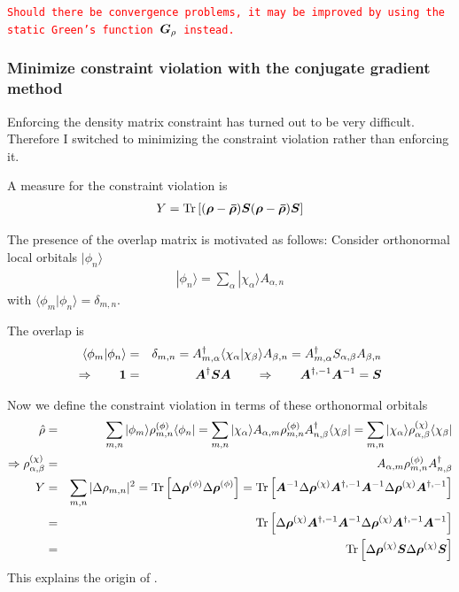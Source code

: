 \documentclass[11pt,a4paper]{report}
\newcommand{\petertt}[1]{\textcolor{red}{\texttt{#1}}}
\begin{document}
\petertt{Should
  there be convergence problems, it may be improved by using the
  static Green's function $\bm{G}_\rho$ instead.}

\subsubsection{Minimize constraint violation with the conjugate gradient method}
Enforcing the density matrix constraint has turned out to be very
difficult. Therefore I switched to minimizing the constraint violation
rather than enforcing it. 

A measure for the constraint violation is
\begin{eqnarray}
Y=\mathrm{Tr}\left[(\bm{\rho}-\bm{\bar{\rho}})
\bm{S}(\bm{\rho}-\bm{\bar{\rho}})\bm{S}\right]
\label{eq:paw_constraints_violation}
\end{eqnarray}

The presence of the overlap matrix is motivated as follows:
Consider orthonormal local orbitals $|\phi_n\rangle$
\begin{eqnarray}
|\phi_n\rangle=\sum_\alpha|\chi_\alpha\rangle A_{\alpha,n}
\end{eqnarray}
with $\langle\phi_m|\phi_n\rangle=\delta_{m,n}$.

The overlap is
\begin{eqnarray}
\langle\phi_m|\phi_n\rangle&=&\delta_{m,n}
=A^\dagger_{m,\alpha}\langle\chi_\alpha|\chi_\beta\rangle A_{\beta,n}
=A^\dagger_{m,\alpha}S_{\alpha,\beta} A_{\beta,n}
\nonumber\\
\Rightarrow\qquad
\bm{1}&=&\bm{A}^\dagger\bm{S}\bm{A}
\qquad\Rightarrow\qquad
\bm{A}^{\dagger,-1}\bm{A}^{-1}=\bm{S}
\end{eqnarray}

Now we define the constraint violation in terms of these orthonormal
orbitals
\begin{eqnarray}
\hat{\rho}
&=&\sum_{m,n}|\phi_m\rangle\rho^{(\phi)}_{m,n}\langle\phi_n|
=\sum_{m,n}|\chi_\alpha\rangle A_{\alpha,m}\rho^{(\phi)}_{m,n} A^\dagger_{n,\beta}\langle\chi_\beta|
=\sum_{m,n}|\chi_\alpha\rangle \rho^{(\chi)}_{\alpha,\beta} \langle\chi_\beta|
\nonumber\\
\Rightarrow
\rho^{(\chi)}_{\alpha,\beta}&=&A_{\alpha,m}\rho^{(\phi)}_{m,n} A^\dagger_{n,\beta}
\nonumber\\
Y&=&\sum_{m,n}|\Delta\rho_{m,n}|^2
=\mathrm{Tr}\left[\Delta\bm{\rho}^{(\phi)}\Delta\bm{\rho}^{(\phi)}\right]
=\mathrm{Tr}\left[\bm{A}^{-1}\Delta\bm{\rho}^{(\chi)}\bm{A}^{\dagger,-1}\bm{A}^{-1}
\Delta\bm{\rho}^{(\chi)}\bm{A}^{\dagger,-1}\right]
\nonumber\\
&=&\mathrm{Tr}\left[\Delta\bm{\rho}^{(\chi)}\bm{A}^{\dagger,-1}\bm{A}^{-1}
\Delta\bm{\rho}^{(\chi)}\bm{A}^{\dagger,-1}\bm{A}^{-1}\right]
\nonumber\\
&=&\mathrm{Tr}\left[\Delta\bm{\rho}^{(\chi)}\bm{S}\Delta\bm{\rho}^{(\chi)}\bm{S}\right]
\end{eqnarray}
This explains the origin of .
\end{document}
